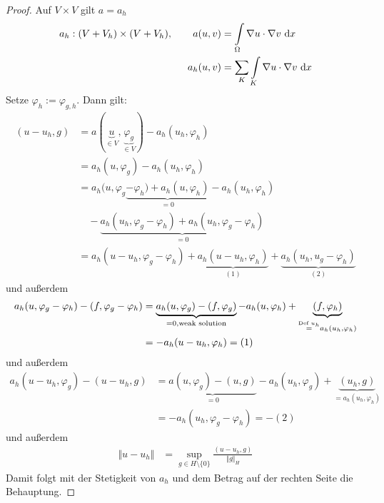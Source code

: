 \begin{proof}
	Auf $V\times V$ gilt $a=a_h$
	\begin{align*}
		a_h:(V+V_h)\times(V+V_h),\qquad
		a(u,v)&=\int\limits_\Omega\nabla u\cdot\nabla v\text{ d} x\\
		a_h(u,v)&=\sum\limits_{K}\int\limits_K\nabla u\cdot\nabla v\text{ d} x
	\end{align*}
	Setze $\varphi_h:=\varphi_{g,h}$. Dann gilt:
	\begin{align*}
		(u-u_h,g)&=a(\underbrace{u}_{\in V},\underbrace{\varphi_g}_{\in V})-a_h(u_h,\varphi_h)\\
		&=a_h(u,\varphi_g)-a_h(u_h,\varphi_h)\\
		&=a_h(u,\varphi_g\underbrace{-\varphi_h)+a_h(u,\varphi_h)}_{=0}-a_h(u_h,\varphi_h)\\
		&{} \quad-\underbrace{a_h(u_h,\varphi_g-\varphi_h)+a_h(u_h,\varphi_g-\varphi_h)}_{=0}\\
		&=a_h(u-u_h,\varphi_g-\varphi_h)+\underbrace{a_h(u-u_h,\varphi_h)}_{(1)}+\underbrace{a_h(u_h,u_g-\varphi_h)}_{(2)}
	\end{align*}
	und außerdem
	\begin{align*}
		a_h(u,\varphi_g-\varphi_h)-(f,\varphi_g-\varphi_h)
		&=\underbrace{a_h(u,\varphi_g)-(f,\varphi_g)}_{=0, \text{weak solution}}-a_h(u,\varphi_h)+\underbrace{(f,\varphi_h)}_{\stackrel{\text{Def }u_h}{=}a_h(u_h,\varphi_h)}\\
		&=-a_h(u-u_h,\varphi_h) = (1)
	\end{align*}
	und außerdem %
	\begin{align*}
		a_h(u-u_h,\varphi_g)-(u-u_h,g)
		&=\underbrace{a(u,\varphi_g)-(u,g)}_{=0}-a_h(u_h,\varphi_g)+\underbrace{(u_h,g)}_{=a_h(u_h,\varphi_h)}\\
		&=-a_h(u_h,\varphi_g-\varphi_h) = -(2)
	\end{align*}
	und außerdem %
	\begin{align*}
		\Vert u-u_h\Vert
		&=\sup\limits_{g\in H\setminus\lbrace0\rbrace}\frac{(u-u_h,g)}{\Vert g\Vert_H}
	\end{align*}
	Damit folgt mit der Stetigkeit von $a_h$ und dem Betrag auf der rechten Seite die Behauptung.
\end{proof}

